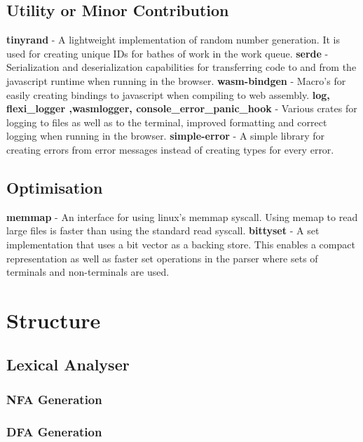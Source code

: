 \subsection{Utility or Minor Contribution}
\textbf{tinyrand} - A lightweight implementation of random number
generation. It is used for creating unique IDs for bathes of work in the work
queue.
\textbf{serde} - Serialization and deserialization capabilities for transferring
code to and from the javascript runtime when running in the browser.
\newline\newline
\textbf{wasm-bindgen} - Macro's for easily creating bindings to javascript when
compiling to web assembly.
\newline\newline
\textbf{log, flexi\_logger ,wasm\-logger, console\_error\_panic\_hook} - Various
crates for logging to files as well as to the terminal, improved formatting and
correct logging when running in the browser.
\newline\newline
\textbf{simple-error} - A simple library for creating errors from error messages
instead of creating types for every error.

\subsection{Optimisation}
\textbf{memmap} - An interface for using linux's memmap syscall. Using memap to
read large files is  faster than using the standard read syscall.
\newline\newline
\textbf{bittyset} - A set implementation that uses a bit vector as a backing
store. This enables a compact representation as well as faster set operations in
the parser where sets of terminals and non-terminals are used.

\section{Structure} \label{structure}
\subsection{Lexical Analyser}
\subsubsection{NFA Generation}
\subsubsection{DFA Generation}
